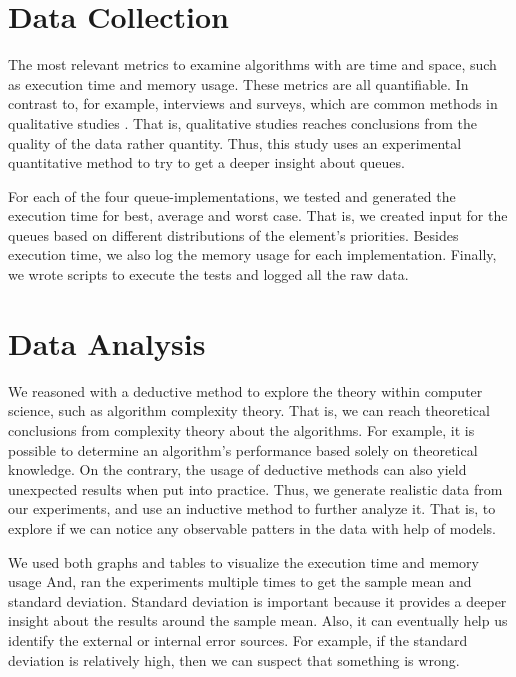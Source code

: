 \documentclass[a4paper,11pt]{kth-mag}
\newcommand*{\skippara}{\par\vspace{\baselineskip} \noindent}
\begin{document}
\section{Data Collection}
The most relevant metrics to examine algorithms with are time and space, such as execution time and memory usage.
These metrics are all quantifiable.
In contrast to, for example, interviews and surveys, which are common methods in qualitative studies \cite{Omexperi69:online, haakansson2013portal}.
That is, qualitative studies reaches conclusions from the quality of the data rather quantity.
Thus, this study uses an experimental quantitative method to try to get a deeper insight about queues.

\skippara For each of the four queue-implementations, we tested and generated the execution time for best, average and worst case.
That is, we created input for the queues based on different distributions of the element's priorities.
Besides execution time, we also log the memory usage for each implementation.
Finally, we wrote scripts to execute the tests and logged all the raw data.

\section{Data Analysis}
We reasoned with a deductive method to explore the theory within computer science, such as algorithm complexity theory.
That is, we can reach theoretical conclusions from complexity theory about the algorithms.
For example, it is possible to determine an algorithm's performance based solely on theoretical knowledge.
On the contrary, the usage of deductive methods can also yield unexpected results when put into practice.
Thus, we generate realistic data from our experiments, and use an inductive method to further analyze it.
That is, to explore if we can notice any observable patters in the data with help of models.

\skippara We used both graphs and tables to visualize the execution time and memory usage
And, ran the experiments multiple times to get the sample mean and standard deviation.
Standard deviation is important because it provides a deeper insight about the results around the sample mean.
Also, it can eventually help us identify the external or internal error sources.
For example, if the standard deviation is relatively high, then we can suspect that something is wrong.
\end{document}
